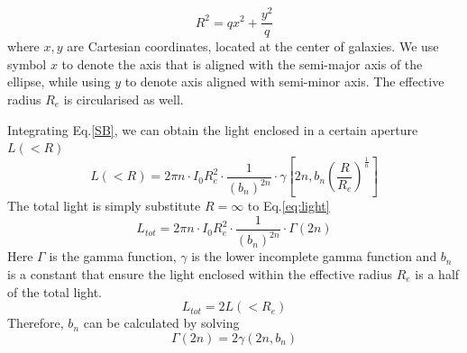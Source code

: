 \documentclass[fleqn,usenatbib]{mnras}
\begin{document}
\begin{equation}
    R^2 = qx^2 + \frac{y^2}{q}
\end{equation}
where $x,y$ are Cartesian coordinates, located at the center of galaxies. We use symbol $x$ to denote the axis that is aligned with the semi-major axis of the ellipse, while using $y$ to denote axis aligned with semi-minor axis. The effective radius $R_e$ is circularised as well.
\par Integrating Eq.\ref{SB}, we can obtain the light enclosed in a certain aperture $L(<R)$ 
\begin{equation}
    \label{eq:light}
    L(<R) = 2\pi n\cdot I_0R_e^2 \cdot \frac{1}{\left(b_n\right)^{2n}}\cdot \gamma\left[2n,b_n \left(\frac{R}{R_e}\right)^{\frac{1}{n}}\right]
\end{equation}
The total light is simply substitute $R = \infty$ to Eq.\ref{eq:light}
\begin{equation}
    L_{tot} = 2\pi n\cdot I_0R_e^2 \cdot \frac{1}{\left(b_n\right)^{2n}}\cdot \Gamma\left(2n\right)
\end{equation}
Here $\Gamma$ is the gamma function, $\gamma$ is the lower incomplete gamma function and $b_n$ is a constant that ensure the light enclosed within the effective radius $R_e$ is a half of the total light.
\begin{equation}
    L_{tot} = 2 L(<R_e)
\end{equation}
Therefore, $b_n$ can be calculated by solving
\begin{equation}
    \Gamma(2n) = 2\gamma(2n, b_n)
\end{equation}
\end{document}
